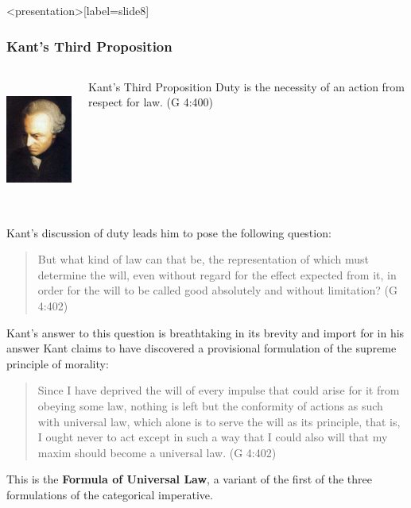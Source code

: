 \begin{frame}<presentation>[label=slide8]
    \frametitle{Kant's Third Proposition}
        \begin{columns}
            \begin{column}{3cm}
                \includegraphics[height=4cm]{../../graphics/kant.jpg}
            \end{column}
            \begin{column}{7cm}
                \begin{block}{Kant's Third Proposition}
                	Duty is the necessity of an action from respect for law. (G 4:400)
                \end{block}
            \end{column}
        \end{columns}
\end{frame}

Kant's discussion of duty leads him to pose the following question:

\begin{quote}
	But what kind of law can that be, the representation of which must determine the will, even without regard for the effect expected from it, in order for the will to be called good absolutely and without limitation? (G 4:402)
\end{quote}

Kant's answer to this question is breathtaking in its brevity and import for in his answer Kant claims to have discovered a provisional formulation of the supreme principle of morality:

\begin{quote}
	Since I have deprived the will of every impulse that could arise for it from obeying some law, nothing is left but the conformity of actions as such with universal law, which alone is to serve the will as its principle, that is, I ought never to act except in such a way that I could also will that my maxim should become a universal law. (G 4:402)
\end{quote}

This is the \textbf{Formula of Universal Law}, a variant of the first of the three formulations of the categorical imperative. \change

